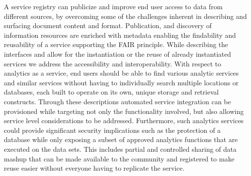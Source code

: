 A service registry can publicize and improve end user access to data
from different sources, by overcoming some of the challenges inherent
in describing and surfacing document content and format. Publication,
and discovery of information resources are enriched with metadata
enabling the findability and reusability of a service supporting the
FAIR principle. While describing the interfaces and allow for the
instantiation or the reuse of already instantiated services we address
the accessibility and interoperability. With respect to analytics as a
service, end users should be able to find various analytic services
and similar services without having to individually search multiple
locations or databases, each built to operate on its own, unique
storage and retrieval constructs. Through these descriptions automated
service integration can be provisioned while targeting not only the
functionality involved, but also allowing service level considerations
to be addressed. Furthermore, such analytics services could provide
significant security implications such as the protection of a database
while only exposing a subset of approved analytics functions that are
executed on the data sets. This includes partial and controlled
sharing of data mashup that can be made available to the community and
registered to make reuse easier without everyone having to replicate
the service.

